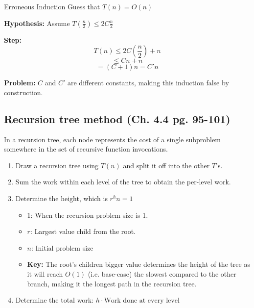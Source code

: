     \begin{warning}
        Erroneous Induction
            Guess that \( T(n) = O(n) \)
            
            \textbf{Hypothesis:} Assume \( T\left( \frac{n}{2} \right) \leq 2C \frac{n}{2} \)
            
            \textbf{Step:}
            \[
            T(n) \leq 2C \left( \frac{n}{2} \right) + n
            \]
            \[
            \leq Cn + n
            \]
            \[
            = (C + 1)n = C'n
            \]
            
            \textbf{Problem:} \( C \) and \( C' \) are different constants, making this induction false by construction.
    \end{warning}

\subsection{Recursion tree method (Ch. 4.4 pg. 95-101)}
    \begin{definition}
        In a recursion tree, each node represents the cost of a single subproblem somewhere in the set of recursive function invocations.
    \end{definition}

    \begin{process}
        \begin{enumerate}
            \item Draw a recursion tree using $T(n)$ and split it off into the other $T$'s.
            \item Sum the work within each level of the tree to obtain the per-level work.
            \item Determine the height, which is $r^h n = 1$ 
            \begin{itemize}
                \item 1: When the recursion problem size is 1. 
                \item $r$: Largest value child from the root. 
                \item $n$: Initial problem size
                \item \textbf{Key:} The root's children bigger value determines the height of the tree as it will reach $O(1)$ (i.e. base-case) the slowest compared to the other branch, making it the longest path in the recursion tree. 
            \end{itemize}
            \item Determine the total work: $h \cdot \text{Work done at every level}$ 
        \end{enumerate}
    \end{process}

